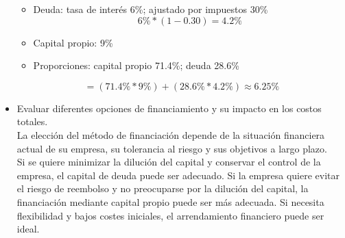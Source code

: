 \documentclass[letterpaper,12pt]{article}
\begin{document}
\begin{sloppypar}
\begin{itemize}
\begin{itemize}
        \item Deuda: tasa de interés 6\%; ajustado por impuestos 30\%
        $$6\% * (1-0.30) = 4.2\%$$
        \item Capital propio: 9\%
        \item Proporciones: capital propio 71.4\%; deuda 28.6\%
    \end{itemize}
    $$= (71.4\% * 9\%) + (28.6\% * 4.2\%) \approx  6.25\%$$
    \item Evaluar diferentes opciones de financiamiento y su impacto en los costos
    totales.
    \vspace{0.3cm}\\ 
    La elección del método de financiación depende de la situación financiera actual de su empresa, su tolerancia al riesgo y sus objetivos a largo plazo.\\
    Si se quiere minimizar la dilución del capital y conservar el control de la empresa, el capital de deuda puede ser adecuado.
    Si la empresa quiere evitar el riesgo de reembolso y no preocuparse por la dilución del capital, la financiación mediante capital propio puede ser más adecuada.
    Si necesita flexibilidad y bajos costes iniciales, el arrendamiento financiero puede ser ideal.
\end{itemize}


\end{sloppypar}
\end{document}

